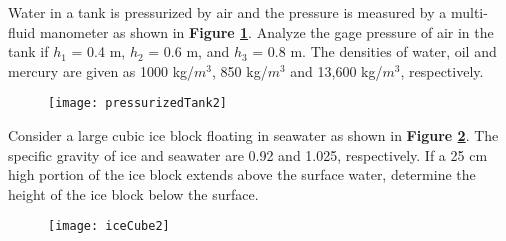 \clearpage		%
\question{}

\listbeginx	%
	\item Water in a tank is pressurized by air and the pressure is measured by a multi-fluid manometer as shown in \textbf{Figure \ref{fig:pressurizedTank}}. Analyze the gage pressure of air in the tank if $h_{1}$ = 0.4 m, $h_{2}$ = 0.6 m, and $h_{3}$ = 0.8 m. The densities of water, oil and mercury are given as 1000 kg/$m^{3}$, 850 kg/$m^{3}$ and 13,600 kg/$m^{3}$, respectively.  
	
	
		

        \begin{figure}[H] %
		\centering
		\texttt{[image: pressurizedTank2]}
		\caption{\rajah}
		\label{fig:pressurizedTank}
	    \end{figure}
	
	
	\item Consider a large cubic ice block floating in seawater as shown in \textbf{Figure \ref{fig:iceCube}}. The specific gravity of ice and seawater are 0.92 and 1.025, respectively. If a 25 cm high portion of the ice block extends above the surface water, determine the height of the ice block below the surface.   
	
	

	
	\begin{figure}[H] %
		\centering
		\texttt{[image: iceCube2]}
		\caption{\rajah}
		\label{fig:iceCube}
	    \end{figure}

